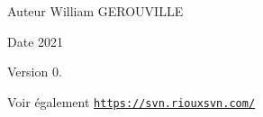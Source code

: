 \begin{DoxyAuthor}{Auteur}
William G\+E\+R\+O\+U\+V\+I\+L\+LE 
\end{DoxyAuthor}
\begin{DoxyDate}{Date}
2021 
\end{DoxyDate}
\begin{DoxyVersion}{Version}
0. 
\end{DoxyVersion}
\begin{DoxySeeAlso}{Voir également}
\href{https://svn.riouxsvn.com/}{\tt https\+://svn.\+riouxsvn.\+com/} 
\end{DoxySeeAlso}

